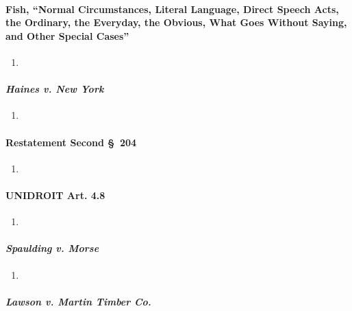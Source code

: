 \paragraph{Fish, ``Normal Circumstances, Literal Language, Direct Speech 
Acts, the Ordinary, the Everyday, the Obvious, What Goes Without Saying, and 
Other Special Cases''}

\begin{enumerate}
    \item %
\end{enumerate}

\paragraph{\emph{Haines v. New York}}

\begin{enumerate}
    \item %
\end{enumerate}

\paragraph{Restatement Second \S\ 204}

\begin{enumerate}
    \item %
\end{enumerate}

\paragraph{UNIDROIT Art. 4.8}

\begin{enumerate}
    \item %
\end{enumerate}

\paragraph{\emph{Spaulding v. Morse}}

\begin{enumerate}
    \item %
\end{enumerate}

\paragraph{\emph{Lawson v. Martin Timber Co.}}

